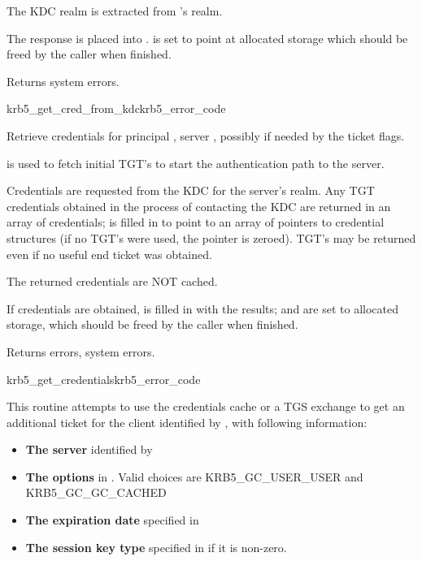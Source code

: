 The KDC realm is extracted from 's realm.

The response is placed into .
 is set to point at allocated storage
which should be freed by the caller when finished.

Returns system errors.

\begin{funcdecl}{krb5_get_cred_from_kdc}{krb5_error_code}{\funcinout}
\funcin
{}
\funcout			
{}
\end{funcdecl}


Retrieve credentials for principal ,
server , possibly
 if needed by the ticket flags.

 is used to fetch initial TGT's to start the authentication
path to the server.

Credentials are requested from the KDC for the server's realm.  Any
TGT credentials obtained in the process of contacting the KDC are
returned in an array of credentials;  is filled in to
point to an array of pointers to credential structures (if no TGT's were
used, the pointer is zeroed).  TGT's may be returned even if no useful
end ticket was obtained.

The returned credentials are NOT cached.

If credentials are obtained,  is filled in with the results;
 and
 are set to allocated storage,
which should be freed by the caller when finished.

Returns errors, system errors.


\begin{funcdecl}{krb5_get_credentials}{krb5_error_code}{\funcinout}
\funcin
{}
\funcout
{}
\end{funcdecl}

This routine attempts to use the credentials cache  or a TGS
exchange to get an additional ticket for the client identified by
, with following information: 
\begin{itemize}
\item {\bf The server} identified by  
\item {\bf The options} in .
Valid choices are KRB5_GC_USER_USER and KRB5_GC_GC_CACHED
\item {\bf The expiration date} specified in
\item {\bf The session key type} specified in
 if it is non-zero.
\end{itemize}

